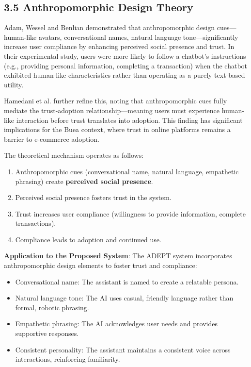 \documentclass[12pt,a4paper]{article}
\begin{document}
\subsection{3.5 Anthropomorphic Design Theory}

Adam, Wessel and Benlian \citep{adam2021} demonstrated that anthropomorphic design cues---human-like avatars, conversational names, natural language tone---significantly increase user compliance by enhancing perceived social presence and trust. In their experimental study, users were more likely to follow a chatbot's instructions (e.g., providing personal information, completing a transaction) when the chatbot exhibited human-like characteristics rather than operating as a purely text-based utility.

Hamedani et al. \citep{hamedani2026} further refine this, noting that anthropomorphic cues fully mediate the trust-adoption relationship---meaning users must experience human-like interaction before trust translates into adoption. This finding has significant implications for the Buea context, where trust in online platforms remains a barrier to e-commerce adoption.

The theoretical mechanism operates as follows:

\begin{enumerate}
    \item Anthropomorphic cues (conversational name, natural language, empathetic phrasing) create \textbf{perceived social presence}.
    \item Perceived social presence fosters trust in the system.
    \item Trust increases user compliance (willingness to provide information, complete transactions).
    \item Compliance leads to adoption and continued use.
\end{enumerate}

\textbf{Application to the Proposed System}: The ADEPT system incorporates anthropomorphic design elements to foster trust and compliance:

\begin{itemize}
    \item Conversational name: The assistant is named to create a relatable persona.
    \item Natural language tone: The AI uses casual, friendly language rather than formal, robotic phrasing.
    \item Empathetic phrasing: The AI acknowledges user needs and provides supportive responses.
    \item Consistent personality: The assistant maintains a consistent voice across interactions, reinforcing familiarity.
\end{itemize}
\end{document}
